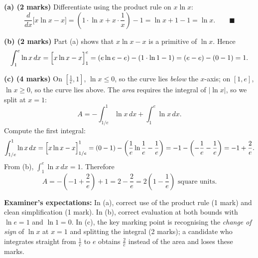 \documentclass[11pt]{article}
\begin{document}
\begin{corrige}
\textbf{(a) (2 marks)} Differentiate using the product rule on $x\ln x$:
\[
\frac{d}{dx}\bigl[x\ln x - x\bigr] = \left(1\cdot\ln x + x\cdot\frac{1}{x}\right) - 1 = \ln x + 1 - 1 = \ln x. \qquad \blacksquare
\]

\textbf{(b) (2 marks)} Part (a) shows that $x\ln x - x$ is a primitive of $\ln x$. Hence
\[
\int_1^e \ln x\,dx = \Bigl[x\ln x - x\Bigr]_1^e = (e\ln e - e) - (1\cdot\ln 1 - 1) = (e - e) - (0 - 1) = 1.
\]

\textbf{(c) (4 marks)} On $\left[\frac1e, 1\right]$, $\ln x \le 0$, so the curve lies \emph{below} the $x$-axis; on $[1, e]$, $\ln x \ge 0$, so the curve lies above. The \emph{area} requires the integral of $|\ln x|$, so we split at $x = 1$:
\[
A = -\int_{1/e}^{1} \ln x\,dx + \int_{1}^{e} \ln x\,dx.
\]
Compute the first integral:
\[
\int_{1/e}^{1} \ln x\,dx = \Bigl[x\ln x - x\Bigr]_{1/e}^{1} = (0 - 1) - \left(\frac{1}{e}\ln\frac{1}{e} - \frac{1}{e}\right) = -1 - \left(-\frac{1}{e} - \frac{1}{e}\right) = -1 + \frac{2}{e}.
\]
From (b), $\displaystyle\int_1^e \ln x\,dx = 1$. Therefore
\[
A = -\left(-1 + \frac{2}{e}\right) + 1 = 2 - \frac{2}{e} = 2\left(1 - \frac{1}{e}\right) \text{ square units}.
\]

\textbf{Examiner's expectations:} In (a), correct use of the product rule (1 mark) and clean simplification (1 mark). In (b), correct evaluation at both bounds with $\ln e = 1$ and $\ln 1 = 0$. In (c), the key marking point is recognising the \emph{change of sign} of $\ln x$ at $x = 1$ and splitting the integral (2 marks); a candidate who integrates straight from $\frac1e$ to $e$ obtains $\frac{2}{e}$ instead of the area and loses these marks.
\end{corrige}
\end{document}
